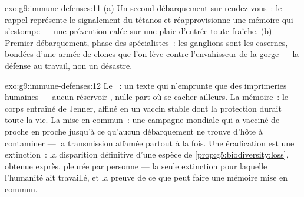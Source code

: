 \begin{solution}{exo:g9:immune-defenses:11}
(a) Un second débarquement sur rendez-vous~: le rappel
représente le signalement du tétanos et réapprovisionne une
mémoire qui s'estompe --- une prévention calée sur une plaie
d'entrée toute fraîche. (b) Premier débarquement, phase des
spécialistes~: les ganglions sont les casernes, bondées
d'une armée de clones que l'on lève contre l'envahisseur de
la gorge --- la défense au travail, non un désastre.
\end{solution}

\begin{solution}{exo:g9:immune-defenses:12}
Le ~: un texte qui n'emprunte que des imprimeries
humaines --- aucun réservoir , nulle part où se
cacher ailleurs. La mémoire~: le corps entraîné de Jenner,
affiné en un vaccin stable dont la protection durait toute
la vie. La mise en commun~: une campagne mondiale qui a
vacciné de proche en proche jusqu'à ce qu'aucun débarquement
ne trouve d'hôte à contaminer --- la transmission affamée
partout à la fois. Une éradication est une extinction~: la
disparition définitive d'une espèce de
\cref{prop:g5:biodiversity:loss}, obtenue exprès, pleurée
par personne --- la seule extinction pour laquelle
l'humanité ait travaillé, et la preuve de ce que peut faire
une mémoire mise en commun.
\end{solution}

